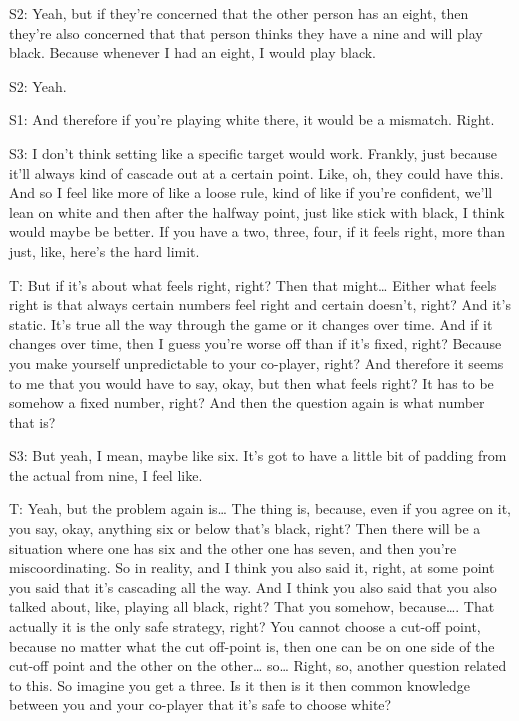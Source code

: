 S2: Yeah, but if they're concerned that the other person has an eight, then they're also concerned that that person thinks they have a nine and will play black. Because whenever I had an eight, I would play black. 

S2: Yeah.

S1: And therefore if you're playing white there, it would be a mismatch. Right. 

S3: I don't think setting like a specific target would work. Frankly, just because it'll always kind of cascade out at a certain point. Like, oh, they could have this. And so I feel like more of like a loose rule, kind of like if you're confident, we'll lean on white and then after the halfway point, just like stick with black, I think would maybe be better. If you have a two, three, four, if it feels right, more than just, like, here's the hard limit. 

T: But if it's about what feels right, right? Then that might… Either what feels right is that always certain numbers feel right and certain doesn’t, right? And it's static. It's true all the way through the game or it changes over time. And if it changes over time, then I guess you're worse off than if it's fixed, right? Because you make yourself unpredictable to your co-player, right? And therefore it seems to me that you would have to say, okay, but then what feels right? It has to be somehow a fixed number, right? And then the question again is what number that is?

S3: But yeah, I mean, maybe like six. It's got to have a little bit of padding from the actual from nine, I feel like. 

T: Yeah, but the problem again is… The thing is, because, even if you agree on it, you say, okay, anything six or below that's black, right? Then there will be a situation where one has six and the other one has seven, and then you're miscoordinating. So in reality, and I think you also said it, right, at some point you said that it's cascading all the way. And I think you also said that you also talked about, like, playing all black, right? That you somehow, because…. That actually it is the only safe strategy, right? You cannot choose a cut-off point, because no matter what the cut off-point is, then one can be on one side of the cut-off point and the other on the other… so… Right, so, another question related to this. So imagine you get a three. Is it then is it then common knowledge between you and your co-player that it's safe to choose white? 


